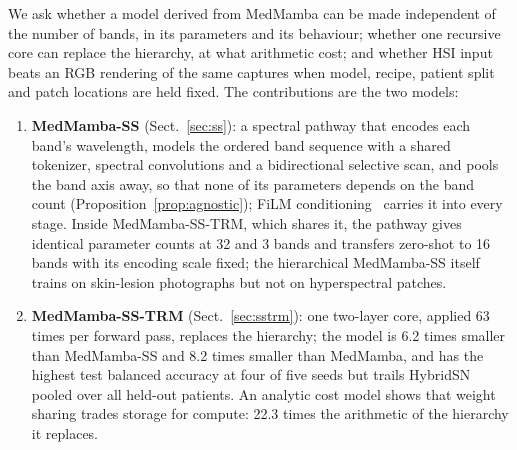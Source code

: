 \documentclass{svproc}
\begin{document}
We ask whether a model derived from MedMamba can be made independent of the number of bands, in its parameters and its behaviour; whether one recursive core can replace the hierarchy, at what arithmetic cost; and whether HSI input beats an RGB rendering of the same captures when model, recipe, patient split and patch locations are held fixed. The contributions are the two models:
\begin{enumerate}
\item \textbf{MedMamba-SS} (Sect.~\ref{sec:ss}): a spectral pathway that encodes each band's wavelength, models the ordered band sequence with a shared tokenizer, spectral convolutions and a bidirectional selective scan, and pools the band axis away, so that none of its parameters depends on the band count (Proposition~\ref{prop:agnostic}); FiLM conditioning~\cite{film} carries it into every stage. Inside MedMamba-SS-TRM, which shares it, the pathway gives identical parameter counts at 32 and 3 bands and transfers zero-shot to 16 bands with its encoding scale fixed; the hierarchical MedMamba-SS itself trains on skin-lesion photographs but not on hyperspectral patches.
\item \textbf{MedMamba-SS-TRM} (Sect.~\ref{sec:sstrm}): one two-layer core, applied 63 times per forward pass, replaces the hierarchy; the model is 6.2 times smaller than MedMamba-SS and 8.2 times smaller than MedMamba, and has the highest test balanced accuracy at four of five seeds but trails HybridSN pooled over all held-out patients. An analytic cost model shows that weight sharing trades storage for compute: 22.3 times the arithmetic of the hierarchy it replaces.
\end{enumerate}
\end{document}

